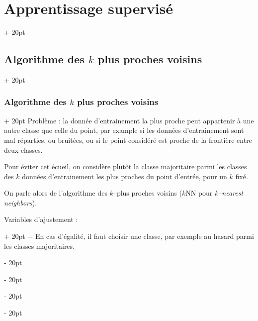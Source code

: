 \documentclass[a4paper, 12pt, twoside]{article}
\newcommand{\ind}[1][20pt]{\advance\leftskip + #1}
\newcommand{\deind}[1][20pt]{\advance\leftskip - #1}
\newenvironment{indt}[2][20pt]{#2 \par \ind[#1]}{\par \deind} %
\begin{document}
\begin{indt}{\section{Apprentissage supervisé}}
\begin{indt}{\subsection{Algorithme des $k$ plus proches voisins}}
\begin{indt}{\subsubsection{Algorithme des $k$ plus proches voisins}}
                Problème : la donnée d'entrainement la plus proche peut appartenir à une autre classe que celle du point, par example si les données d'entrainement sont mal réparties, ou bruitées, ou si le point considéré est proche de la frontière entre deux classes.

                \begin{center}
                \end{center}

                \vspace{6pt}
                
                Pour éviter cet écueil, on considère plutôt la classe majoritaire parmi les classes des $k$ données d'entrainement les plus proches du point d'entrée, pour un $k$ fixé.

                On parle alors de l'algorithme des $k$--plus proches voisins ($k$NN pour $k$--\textit{nearest neighbors}).

                \begin{indt}{Variables d'ajustement :}
                    $-$ En cas d'égalité, il faut choisir une classe, par exemple au hasard parmi les classes majoritaires.


\end{indt}
\end{indt}
\end{indt}
\end{indt}
\end{document}
